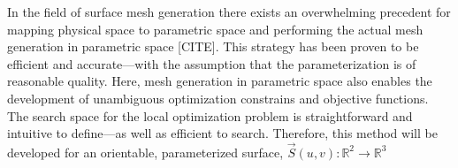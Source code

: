 In the field of surface mesh generation there exists an overwhelming
precedent for mapping physical space to parametric space and performing
the actual mesh generation in parametric space [CITE]. This strategy has
been proven to be efficient and accurate---with the assumption that the
parameterization is of reasonable quality. Here, mesh generation in
parametric space also enables the development of unambiguous
optimization constrains and objective functions. The search space for
the local optimization problem is straightforward and intuitive to
define---as well as efficient to search. Therefore, this method will be
developed for an orientable, parameterized surface,
$\vec{S}\left(u,v\right) : {\mathbb R}^2 \rightarrow {\mathbb R}^3$
